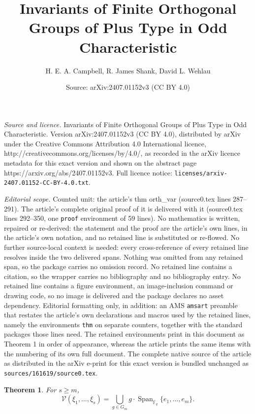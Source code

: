 \documentclass[10pt,a4paper]{amsart}
\title{Invariants of Finite Orthogonal Groups of Plus Type in Odd Characteristic}
\author{H. E. A. Campbell, R. James Shank, David L. Wehlau}
\date{Source: arXiv:2407.01152v3 (CC BY 4.0)}
\newtheorem{thm}{Theorem}
\DeclareMathOperator{\Span}{Span}
\newcommand{\V}{\mathcal{V}}
\newcommand{\field}{\mathbb{F}}
\begin{document}
\maketitle

\noindent\emph{Source and licence.} Invariants of Finite Orthogonal Groups of Plus Type in Odd Characteristic. Version arXiv:2407.01152v3 (CC BY 4.0), distributed by arXiv under the Creative Commons Attribution 4.0 International licence, http://creativecommons.org/licenses/by/4.0/, as recorded in the arXiv licence metadata for this exact version and shown on the abstract page https://arxiv.org/abs/2407.01152v3. Full licence notice: \texttt{licenses/arxiv-2407.01152-CC-BY-4.0.txt}.\par\smallskip

\noindent\textit{Editorial scope.} Counted unit: the article's thm orth\_var (source0.tex lines 287--291). The article's complete original proof of it is delivered with it (source0.tex lines 292--350, one \texttt{proof} environment of 59 lines). No mathematics is written, repaired or re-derived: the statement and the proof are the article's own lines, in the article's own notation, and no retained line is substituted or re-flowed.  No further source-local context is needed: every cross-reference of every retained line resolves inside the two delivered spans.  Nothing was omitted from any retained span, so the package carries no omission record.  No retained line contains a citation, so the wrapper carries no bibliography and no bibliography entry.  No retained line contains a figure environment, an image-inclusion command or drawing code, so no image is delivered and the package declares no asset dependency.  Editorial formatting only, in addition: an AMS \texttt{amsart} preamble that restates the article's own declarations and macros used by the retained lines, namely the environments \texttt{thm} on separate counters, together with the standard packages those lines need.  The retained environments print in this document as Theorem 1 in order of appearance, whereas the article prints the same items with the numbering of its own full document.  The complete native source of the article as distributed in the arXiv e-print for this exact version is bundled unchanged as \texttt{sources/161619/source0.tex}.
\begin{thm}\label{orth_var} For $s\geq m$,
$$\V(\xi_1,\ldots,\xi_s)=\bigcup_{g\in G_m}
g\cdot\Span_{\overline{\field}_q}\{e_1,\ldots,e_m\}.$$
\end{thm}
\end{document}
